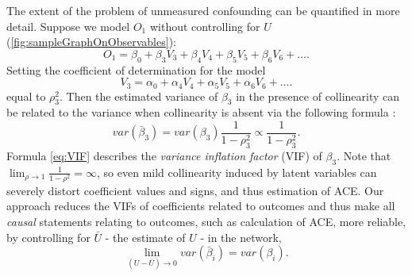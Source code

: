 \documentclass[letterpaper]{article}
\begin{document}
The extent of the problem of unmeasured confounding can be quantified in more detail.  Suppose we model $O_1$ without controlling for $U$ (\ref{fig:sampleGraphOnObservables}): $$O_1 = \beta_0 + \beta_3 V_3 + \beta_4 V_4 + \beta_5 V_5 + \beta_6 V_6 + \dots.$$  Setting the coefficient of determination for the model $$V_3 = \alpha_0 + \alpha_4 V_4 + \alpha_5 V_5 + \alpha_6 V_6 + \dots.$$ equal to $\rho_3^2$.  Then the estimated variance of $\beta_3$ in the presence of collinearity can be related to the variance when collinearity is absent via the following formula \cite{rawlings_applied_1998}:
\begin{equation}
var(\bar{\beta}_3) = var(\beta_3) \frac{1}{1-\rho_3^2} \propto \frac{1}{1-\rho_3^2}.
\label{eq:VIF}
\end{equation}
Formula \ref{eq:VIF} describes the \textit{variance inflation factor} (VIF) of $\beta_3$.  Note that $\lim_{\rho \to 1} \frac{1}{1-\rho^2} = \infty$, so even mild collinearity induced by latent variables can severely distort coefficient values and signs, and thus estimation of ACE.  Our approach reduces the VIFs of coefficients related to outcomes and thus make all \textit{causal} statements relating to outcomes, such as calculation of ACE, more reliable, by controlling for $\bar{U}$ - the estimate of $U$ - in the network,
\begin{equation}
\lim_{(U - \bar{U})\to0} var(\bar{\beta}_i) = var(\beta_i).
\label{eq:vifImprovement}
\end{equation}
\end{document}
